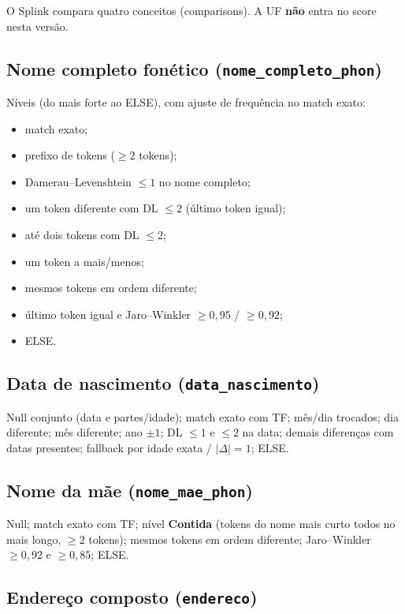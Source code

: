 \documentclass[11pt,a4paper]{article}
\begin{document}
O Splink compara quatro conceitos (comparisons). A UF \textbf{não} entra no
score nesta versão.

\subsection{Nome completo fonético (\texttt{nome\_completo\_phon})}

Níveis (do mais forte ao ELSE), com ajuste de frequência no match exato:

\begin{itemize}
  \item match exato;
  \item prefixo de tokens ($\ge 2$ tokens);
  \item Damerau--Levenshtein $\le 1$ no nome completo;
  \item um token diferente com DL $\le 2$ (último token igual);
  \item até dois tokens com DL $\le 2$;
  \item um token a mais/menos;
  \item mesmos tokens em ordem diferente;
  \item último token igual e Jaro--Winkler $\ge 0{,}95$ / $\ge 0{,}92$;
  \item ELSE.
\end{itemize}

\subsection{Data de nascimento (\texttt{data\_nascimento})}

Null conjunto (data e partes/idade); match exato com TF; mês/dia trocados;
dia diferente; mês diferente; ano $\pm 1$; DL $\le 1$ e $\le 2$ na data;
demais diferenças com datas presentes; fallback por idade exata / $|\Delta|=1$;
ELSE.

\subsection{Nome da mãe (\texttt{nome\_mae\_phon})}

Null; match exato com TF; nível \textbf{Contida} (tokens do nome mais curto
todos no mais longo, $\ge 2$ tokens); mesmos tokens em ordem diferente;
Jaro--Winkler $\ge 0{,}92$ e $\ge 0{,}85$; ELSE.

\subsection{Endereço composto (\texttt{endereco})}
\end{document}
